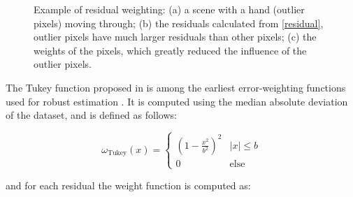\documentclass[acmsmall, nonacm, 11pt]{acmart}
\begin{document}
\begin{figure}[h]
    \centering
    \caption{Example of residual weighting: (a) a scene with a hand (outlier pixels) moving through; (b) the residuals calculated from \eqref{residual}, outlier pixels have much larger residuals than other pixels; (c) the weights of the pixels, which greatly reduced the influence of the outlier pixels. \cite{kerl2013robust}}
    \label{img_weighting}
\end{figure}

The Tukey function proposed in \cite{tukey1975mathematics} is among the earliest error-weighting functions used for robust estimation \cite{tykkala11direct}. It is computed using the median absolute deviation of the dataset, and is defined as follows:

\begin{equation}
\omega_{\text{Tukey}}(x)=\left\{
\begin{array}{ll}
{\left(1-\frac{x^{2}}{b^{2}}\right)^{2}} & {|x| \leq b} \\
{0} & {\text {else}}
\end{array}
\right.
\label{tukey}
\end{equation}

\noindent and for each residual the weight function is computed as:
\end{document}
